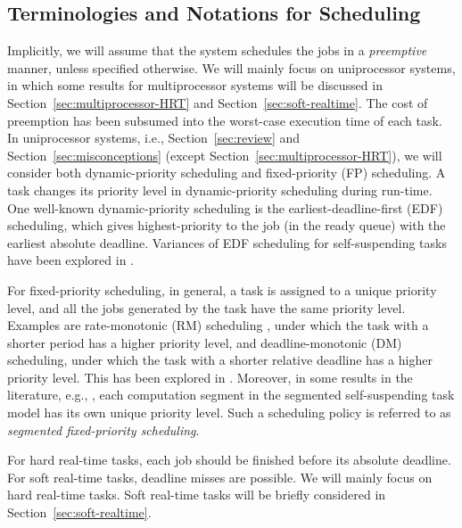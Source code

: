 \subsection{Terminologies and Notations for Scheduling}

Implicitly, we will assume that the system schedules the jobs in a
\emph{preemptive} manner, unless specified otherwise.  We will mainly focus on
uniprocessor systems, in which some results for multiprocessor systems
will be discussed in Section~\ref{sec:multiprocessor-HRT} and
Section~\ref{sec:soft-realtime}. 
 The cost of preemption
has been subsumed into the worst-case execution time of each task. In
uniprocessor systems, i.e., Section~\ref{sec:review} and
Section~\ref{sec:misconceptions} (except Section~\ref{sec:multiprocessor-HRT}), we will consider both
dynamic-priority scheduling and fixed-priority (FP)
scheduling. A task changes its priority level in dynamic-priority
scheduling during run-time. One well-known dynamic-priority scheduling
is the earliest-deadline-first (EDF) scheduling, which gives
highest-priority to the job (in the ready queue) with the earliest
absolute deadline. Variances of EDF scheduling for self-suspending
tasks have been explored in
\cite{RTSS-ChenL14,Liu_2014,DBLP:conf/ecrts/Devi03,WC16-suspend-DATE}.

For fixed-priority scheduling, in general, a task is assigned to a
unique priority level, and all the jobs generated by the task have the
same priority level. Examples are rate-monotonic (RM) scheduling
\cite{Liu_1973}, under which the task with a shorter period has a
higher priority level, and deadline-monotonic (DM) scheduling, under which
the task with a shorter relative deadline has a higher priority level.
This has been explored in
\cite{Raj:suspension1991,RTCSA-KimCPKH95,MingLiRTCSA1994,PH:rtss98,ECRTS-AudsleyB04,RTAS-AudsleyB04,RTCSA-BletsasA05,LR:rtas10,RTSS-KimANR13,LiuChen:rtss2014,huangpass:dac2015,Huang:multiseg,WC16-suspend-DATE}.
Moreover, in some results in the literature, e.g.,
\cite{RTSS-KimANR13,DBLP:journals/ieicet/DingTT09}, each computation
segment in the segmented self-suspending task model has its own unique
priority level. Such a scheduling
policy is referred to as \emph{segmented fixed-priority scheduling}.

For hard real-time tasks, each job should be finished before its
absolute deadline. For soft real-time tasks, deadline misses are
possible. We will mainly focus on hard real-time tasks. 
Soft real-time tasks will be briefly considered in
Section~\ref{sec:soft-realtime}.

